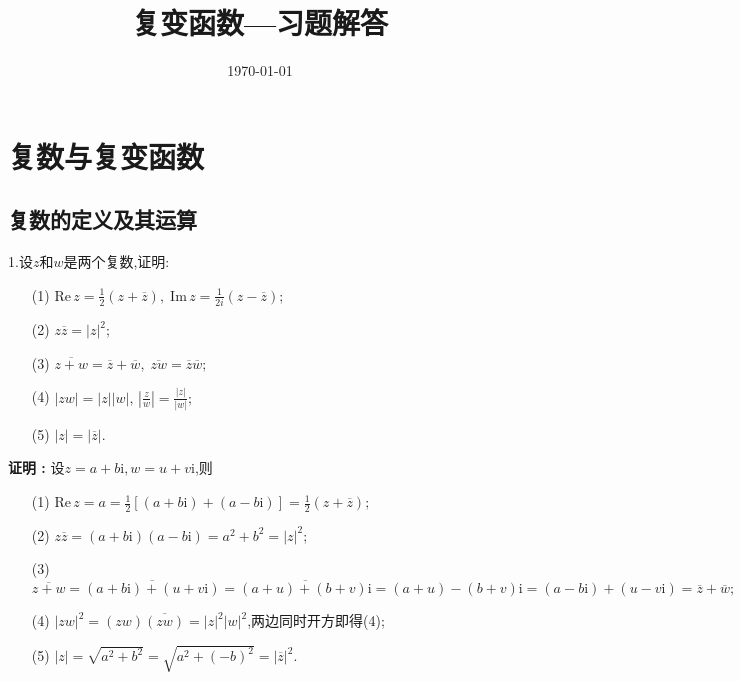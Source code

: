 \documentclass[12pt,fontset=none]{ctexbook}
\title{\fontsize{42pt}{\baselineskip}\selectfont 复变函数---习题解答}
\date{\vspace{16cm}\fontsize{21pt}{\baselineskip}\selectfont \today}
\newenvironment{proof}[1][]{\par \noindent \textbf{\hspace{2em}证明 \vspace{0.1mm} #1 :}}{\par}
\renewcommand{\i}{\mathrm{i}}
\newcommand{\Lin}[1]{\overline{#1}}
\renewcommand{\rm}[1]{\mathrm{#1}\,}
\begin{document}
\maketitle
\everymath{\displaystyle}
\thispagestyle{empty}
\tableofcontents
\setcounter{page}{0}
\thispagestyle{empty}
\newpage

\chapter{复数与复变函数}
\newpage
\section{复数的定义及其运算}
1.设$z$和$w$是两个复数,证明:
\begin{enumerate}
  \item[(1)] $\rm{Re} z =\frac{1}{2}(z + \overline{z}),\;\rm{Im} z =\frac{1}{2i}(z-\overline z);$
  \item[(2)] $z\overline{z}=|z|^{2};$
  \item[(3)] $\overline{z+w}=\overline{z}+\overline{w},\; \overline{zw}=\overline{z}\overline{w};$
  \item[(4)] $|zw|=|z||w|,\,\left|\frac{z}{w}\right|=\frac{|z|}{|w|};$
  \item[(5)] $|z|=|\overline{z}|.$
\end{enumerate}
\begin{proof}
    设$z=a+b\i,w=u+v\i$,则
    \begin{enumerate}
      \item [(1)] $\rm{Re}z =a =\frac{1}{2}[(a+b\i)+(a-b\i)]=\frac{1}{2}(z+\overline{z});$
      \item [(2)] $z\Lin{z}=(a+b\i)(a-b\i)=a^{2}+b^{2}=|z|^{2};$
      \item [(3)] $\Lin{z+w}=\Lin{(a+b\i)+(u+v\i)}=\Lin{(a+u)+(b+v)\i}=(a+u)-(b+v)\i=(a-b\i)+(u-v\i)=\Lin{z}+\Lin{w}; $
      \item [(4)] $|zw|^{2}=(zw)\Lin{(zw)}=|z|^{2}|w|^{2}$,两边同时开方即得(4);
      \item [(5)] $|z|=\sqrt{a^{2}+b^{2}}=\sqrt{a^{2}+(-b)^{2}}=|\Lin{z}|^{2}.$
    \end{enumerate}
\end{proof}

\
\end{document}
